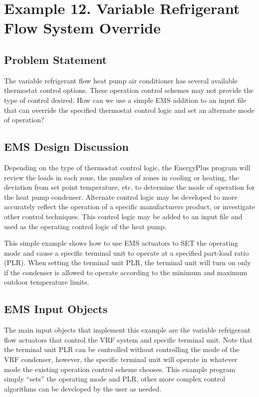 \section{Example 12. Variable Refrigerant Flow System Override}\label{example-12.-variable-refrigerant-flow-system-override}

\subsection{Problem Statement}\label{problem-statement-002}

The variable refrigerant flow heat pump air conditioner has several available thermostat control options. These operation control schemes may not provide the type of control desired. How can we use a simple EMS addition to an input file that can override the specified thermostat control logic and set an alternate mode of operation?

\subsection{EMS Design Discussion}\label{ems-design-discussion-002}

Depending on the type of thermostat control logic, the EnergyPlus program will review the loads in each zone, the number of zones in cooling or heating, the deviation from set point temperature, etc. to determine the mode of operation for the heat pump condenser. Alternate control logic may be developed to more accurately reflect the operation of a specific manufacturers product, or investigate other control techniques. This control logic may be added to an input file and used as the operating control logic of the heat pump.

This simple example shows how to use EMS actuators to SET the operating mode and cause a specific terminal unit to operate at a specified part-load ratio (PLR). When setting the terminal unit PLR, the terminal unit will turn on only if the condenser is allowed to operate according to the minimum and maximum outdoor temperature limits.

\subsection{EMS Input Objects}\label{ems-input-objects-002}

The main input objects that implement this example are the variable refrigerant flow actuators that control the VRF system and specific terminal unit. Note that the terminal unit PLR can be controlled without controlling the mode of the VRF condenser, however, the specific terminal unit will operate in whatever mode the existing operation control scheme chooses. This example program simply ``sets'' the operating mode and PLR, other more complex control algorithms can be developed by the user as needed.

